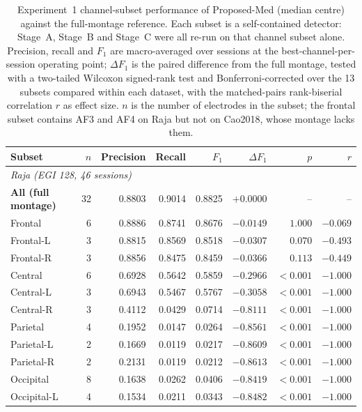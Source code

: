 \begin{table}[htbp]
\centering
\footnotesize
\setlength{\tabcolsep}{4pt}
\caption{Experiment~1 channel-subset performance of Proposed-Med (median centre) against the full-montage reference. Each subset is a self-contained detector: Stage~A, Stage~B and Stage~C were all re-run on that channel subset alone. Precision, recall and $F_1$ are macro-averaged over sessions at the best-channel-per-session operating point; $\Delta F_1$ is the paired difference from the full montage, tested with a two-tailed Wilcoxon signed-rank test and Bonferroni-corrected over the 13 subsets compared within each dataset, with the matched-pairs rank-biserial correlation $r$ as effect size. $n$ is the number of electrodes in the subset; the frontal subset contains AF3 and AF4 on Raja but not on Cao2018, whose montage lacks them.}
\label{tab:exp1_subset_summary}
\begin{tabular}{lrrrrrrr}
\toprule
Subset & $n$ & Precision & Recall & $F_1$ & $\Delta F_1$ & $p$ & $r$ \\
\midrule
\multicolumn{8}{l}{\textit{Raja (EGI 128, 46 sessions)}} \\[2pt]
\textbf{All (full montage)} & 32 & 0.8803 & 0.9014 & 0.8825 & $+0.0000$ & -- & -- \\
Frontal & 6 & 0.8886 & 0.8741 & 0.8676 & $-0.0149$ & $1.000$ & $-0.069$ \\
Frontal-L & 3 & 0.8815 & 0.8569 & 0.8518 & $-0.0307$ & $0.070$ & $-0.493$ \\
Frontal-R & 3 & 0.8856 & 0.8475 & 0.8459 & $-0.0366$ & $0.113$ & $-0.449$ \\
Central & 6 & 0.6928 & 0.5642 & 0.5859 & $-0.2966$ & $<0.001$ & $-1.000$ \\
Central-L & 3 & 0.6943 & 0.5467 & 0.5767 & $-0.3058$ & $<0.001$ & $-1.000$ \\
Central-R & 3 & 0.4112 & 0.0429 & 0.0714 & $-0.8111$ & $<0.001$ & $-1.000$ \\
Parietal & 4 & 0.1952 & 0.0147 & 0.0264 & $-0.8561$ & $<0.001$ & $-1.000$ \\
Parietal-L & 2 & 0.1669 & 0.0119 & 0.0217 & $-0.8609$ & $<0.001$ & $-1.000$ \\
Parietal-R & 2 & 0.2131 & 0.0119 & 0.0212 & $-0.8613$ & $<0.001$ & $-1.000$ \\
Occipital & 8 & 0.1638 & 0.0262 & 0.0406 & $-0.8419$ & $<0.001$ & $-1.000$ \\
Occipital-L & 4 & 0.1534 & 0.0211 & 0.0343 & $-0.8482$ & $<0.001$ & $-1.000$ \\

\end{tabular}
\end{table}
